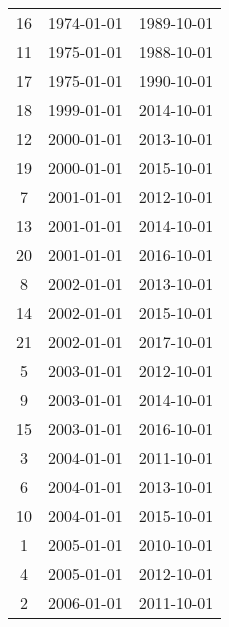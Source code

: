 % 
\begin{tabular}{ccc}
  \hline
  \hline
16 & 1974-01-01 & 1989-10-01 \\ 
  11 & 1975-01-01 & 1988-10-01 \\ 
  17 & 1975-01-01 & 1990-10-01 \\ 
  18 & 1999-01-01 & 2014-10-01 \\ 
  12 & 2000-01-01 & 2013-10-01 \\ 
  19 & 2000-01-01 & 2015-10-01 \\ 
  7 & 2001-01-01 & 2012-10-01 \\ 
  13 & 2001-01-01 & 2014-10-01 \\ 
  20 & 2001-01-01 & 2016-10-01 \\ 
  8 & 2002-01-01 & 2013-10-01 \\ 
  14 & 2002-01-01 & 2015-10-01 \\ 
  21 & 2002-01-01 & 2017-10-01 \\ 
  5 & 2003-01-01 & 2012-10-01 \\ 
  9 & 2003-01-01 & 2014-10-01 \\ 
  15 & 2003-01-01 & 2016-10-01 \\ 
  3 & 2004-01-01 & 2011-10-01 \\ 
  6 & 2004-01-01 & 2013-10-01 \\ 
  10 & 2004-01-01 & 2015-10-01 \\ 
  1 & 2005-01-01 & 2010-10-01 \\ 
  4 & 2005-01-01 & 2012-10-01 \\ 
  2 & 2006-01-01 & 2011-10-01 \\ 
   \hline
\end{tabular}
